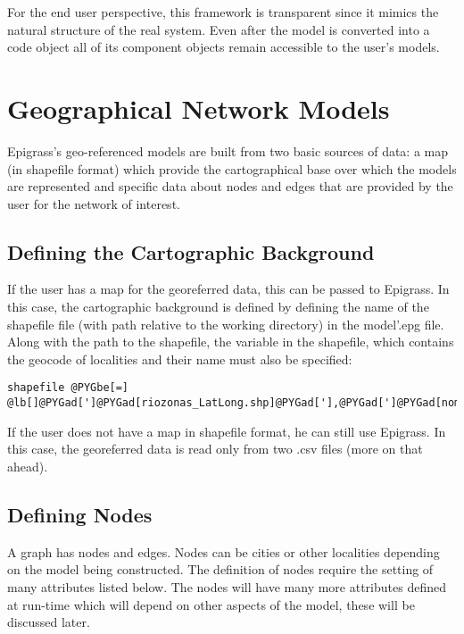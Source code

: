 \documentclass[a4paper,10pt]{manual}
\begin{document}
For the end user perspective, this framework is transparent since it mimics the natural structure of the real system. Even after the model is converted into a code object all of its component objects remain accessible to the user's  models.


\section{Geographical Network Models}
Epigrass's geo-referenced models are built from two basic sources of data: a map (in shapefile format) which provide the cartographical base over which the models are represented and specific data about nodes and edges that are provided by the user for the network of interest.


\subsection{Defining the Cartographic Background}

If the user has a map for the georeferred data, this can be passed to Epigrass. In this case, the cartographic background is defined by defining the name of the shapefile file (with path relative to the working directory) in the model'.epg file. Along with the path to the shapefile,  the variable in the shapefile, which contains the geocode of localities and their name must also be specified:

\begin{Verbatim}[commandchars=@\[\]]
shapefile @PYGbe[=]  @lb[]@PYGad[']@PYGad[riozonas_LatLong.shp]@PYGad['],@PYGad[']@PYGad[nome_zonas]@PYGad['],@PYGad[']@PYGad[zona_trafe]@PYGad[']@rb[]
\end{Verbatim}

If the user does not have a map in shapefile format, he can still use Epigrass. In this case, the georeferred data is read only from two .csv files (more on that ahead).

\subsection{Defining Nodes}

A graph has nodes and edges. Nodes can be cities or other localities depending on the model being constructed. The definition of nodes require the setting of many attributes listed below. The nodes will have many more attributes defined at run-time which will depend on other aspects of the model, these will be discussed later.
\end{document}
